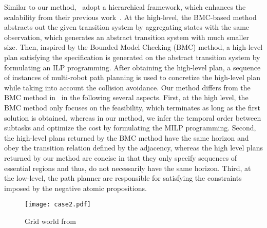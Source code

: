 \documentclass[Afour,sageh,times]{sagej}
\begin{document}
{Similar to our method,~\cite{sahin2019multi} adopt a hierarchical framework, which enhances the scalability from their previous work~\cite{sahin2017synchronous,sahin2019multirobot}. At the high-level, the BMC-based method abstracts out the given transition system by aggregating states with the same observation, which generates an abstract transition system with much smaller size. Then, inspired by the Bounded Model Checking (BMC) method,  a high-level plan satisfying the specification is generated on the abstract transition system by formulating an ILP programming. After obtaining the high-level plan, a sequence of instances of  multi-robot path planning is used to concretize the high-level plan while taking into account the collision avoidance. Our method differs from the BMC method in~\cite{sahin2019multi} in the following several aspects. First, at the high level, the BMC method only focuses on the feasibility, which terminates as long as the first solution is obtained, whereas in our method, we infer the temporal order between subtasks and optimize the cost by formulating the MILP programming. Second, the high-level plans returned by the BMC method have the same horizon and obey the transition relation defined by the adjacency, whereas the high level plans returned by our method are concise in that they only specify sequences of essential regions and thus, do not necessarily have the same horizon. Third, at the low-level, the path planner are responsible for satisfying the constraints imposed by the negative atomic propositions.
 \begin{figure}[!t]
    \centering
    \texttt{[image: case2.pdf]}
    \caption{Grid world from~\cite{sahin2019multi}}\label{fig:scalability}
 \end{figure}


}
\end{document}
